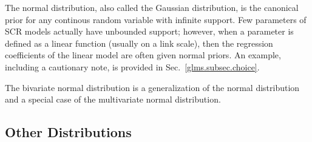 The normal distribution, also called the Gaussian distribution, %
is the canonical prior for any continous random variable with
infinite support. Few parameters of SCR models actually have unbounded
support; however, when a parameter is defined as a linear function
(usually on a link scale), then the regression coefficients of the
linear model are often given normal priors. An example, including a
cautionary note, is provided in Sec.~\ref{glms.subsec.choice}.


The bivariate normal distribution is a generalization of the
normal distribution and a special case of the multivariate normal
distribution.


\subsection{Other Distributions}


